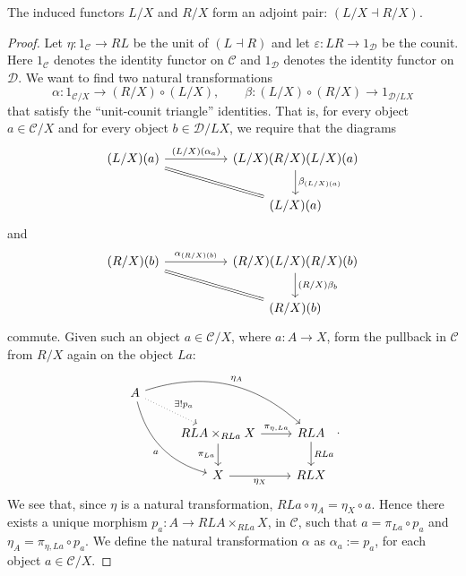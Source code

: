 \begin{proposition}
\label{restriction adjoint pair}
The induced functors $L/X$ and $R/X$ form an adjoint pair: $(L/X \dashv R/X)$.
\end{proposition}
\begin{proof}
Let $\eta : 1_{\mathcal{C}} \to RL$ be the unit of $(L \dashv R)$ and let $\varepsilon : LR \to 1_{\mathcal{D}}$ be the counit. Here $1_{\mathcal{C}}$ denotes the identity functor on $\mathcal{C}$ and $1_{\mathcal{D}}$ denotes the identity functor on $\mathcal{D}$. We want to find two natural transformations
\[ \alpha : 1_{\mathcal{C}/X} \to (R/X) \circ (L/X), \qquad \beta : (L/X) \circ (R/X) \to 1_{\mathcal{D}/LX} \]
that satisfy the ``unit-counit triangle'' identities. That is, for every object $a \in \mathcal{C}/X$ and for every object $b \in \mathcal{D}/LX$, we require that the diagrams
\[ \begin{tikzcd}[column sep=5em,row sep=2em]
(L/X)(a) \arrow[r, "(L/X)(\alpha_a)"] \arrow[dr, equal] & (L/X) (R/X) (L/X) (a) \arrow[d, "\beta_{(L/X)(a)}"] \\
& (L/X)(a)
\end{tikzcd} \]
and
\[ \begin{tikzcd}[column sep=5em,row sep=2em]
(R/X)(b) \arrow[r, "\alpha_{(R/X)(b)}"] \arrow[dr, equal] & (R/X) (L/X) (R/X) (b) \arrow[d, "(R/X)\beta_b"] \\
& (R/X)(b)
\end{tikzcd} \]
commute. Given such an object $a \in \mathcal{C}/X$, where $a : A \to X$, form the pullback in $\mathcal{C}$ from $R/X$ again on the object $La$:
\[\begin{tikzcd}
A \arrow[dr, dotted, "\exists! p_a"] \arrow[ddr, bend right, swap, "a"] \arrow[drr, bend left, "\eta_A"] \\
& RLA \times_{RLa} X \arrow[r, "\pi_{\eta,La}"] \arrow[d, swap, "\pi_{La}"] & RLA \arrow[d, "RLa"] \\
& X \arrow[r, swap, "\eta_X"] & RLX
\end{tikzcd}.\]
We see that, since $\eta$ is a natural transformation, $RLa \circ \eta_A = \eta_X \circ a$. Hence there exists a unique morphism $p_a : A \to RLA \times_{RLa} X$, in $\mathcal{C}$, such that $a = \pi_{La} \circ p_a$ and $\eta_A = \pi_{\eta,La} \circ p_a$. We define the natural transformation $\alpha$ as $\alpha_a := p_a$, for each object $a \in \mathcal{C}/X$.


\end{proof}

